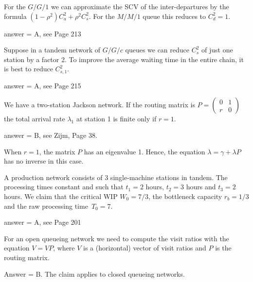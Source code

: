 \begin{exercise}[201804]
For the $G/G/1$ we can approximate the SCV of the inter-departures by the formula $(1-\rho^2)C_a^2 + \rho^2 C_{s}^2$. For the $M/M/1$ queue this reduces to $C_{d}^2 = 1$.
\begin{solution}
answer = A, see Page 213
\end{solution}
\end{exercise}

\begin{exercise}[201804]
Suppose in a tandem network of $G/G/c$ queues we can reduce $C_{s}^2$ of just one station by a factor 2.  To improve the average waiting time in the entire chain, it is  best to reduce $C_{s,1}^2$.   
\begin{solution}
answer = A, see Page 215
\end{solution}
\end{exercise}

\begin{exercise}[201804]
We have a two-station Jackson network. If the routing matrix is $P=
\begin{pmatrix}
  0 & 1\\
r & 0
\end{pmatrix}$ the total arrival rate $\lambda_1$ at station 1 is finite only if $r=1$. 
\begin{solution}
answer = B, see Zijm, Page 38.

When $r=1$, the matrix $P$ has an eigenvalue 1. Hence, the equation $\lambda = \gamma + \lambda P$ has no inverse in this case.
\end{solution}
\end{exercise}


\begin{exercise}[201807]{1}
  A production network consists of 3 single-machine stations in
  tandem. The   processing times constant and such that $t_1=2$ hours, $t_2=3$ hours and $t_3=2$ hours.
We claim that  the critical WIP $W_0=7/3$, the bottleneck
  capacity $r_b=1/3$ and the raw processing time~$T_0=7$.
\begin{solution}
answer = A, see Page 201
\end{solution}
\end{exercise}

\begin{exercise}[201904, 1] For an open queueing network we need to compute the visit ratios with the equation $V = V P$, where $V$ is a (horizontal) vector of visit ratios and $P$ is the routing matrix.
\begin{solution} Answer = B.
    The claim applies to closed queueing networks.
\end{solution}
\end{exercise}


